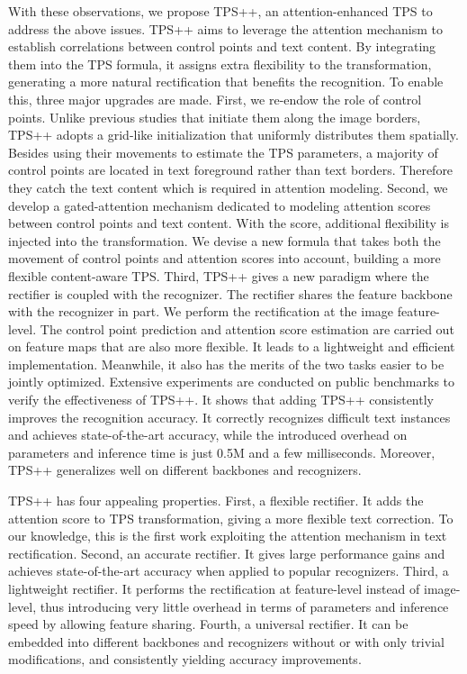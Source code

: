 \documentclass{article}
\begin{document}
With these observations, we propose TPS++, an attention-enhanced TPS to address the above issues. TPS++ aims to leverage the attention mechanism to establish correlations between control points and text content. By integrating them into the TPS formula, it assigns extra flexibility to the transformation, generating a more natural rectification that benefits the recognition. To enable this, three major upgrades are made. First, we re-endow the role of control points. Unlike previous studies that initiate them along the image borders, TPS++ adopts a grid-like initialization that uniformly distributes them spatially. Besides using their movements to estimate the TPS parameters, a majority of control points are located in text foreground rather than text borders. Therefore they catch the text content which is required in attention modeling. Second, we develop a gated-attention mechanism dedicated to modeling attention scores between control points and text content. With the score, additional flexibility is injected into the transformation. We devise a new formula that takes both the movement of control points and attention scores into account, building a more flexible content-aware TPS. Third, TPS++ gives a new paradigm where the rectifier is coupled with the recognizer. The rectifier shares the feature backbone with the recognizer in part. We perform the rectification at the image feature-level. The control point prediction and attention score estimation are carried out on feature maps that are also more flexible. It leads to a lightweight and efficient implementation. Meanwhile, it also has the merits of the two tasks easier to be jointly optimized. Extensive experiments are conducted on public benchmarks to verify the effectiveness of TPS++. It shows that adding TPS++ consistently improves the recognition accuracy. It correctly recognizes difficult text instances and achieves state-of-the-art accuracy, while the introduced overhead on parameters and inference time is just 0.5M and a few milliseconds. Moreover, TPS++ generalizes well on different backbones and recognizers.

TPS++ has four appealing properties. First, a flexible rectifier. It adds the attention score to TPS transformation, giving a more flexible text correction. To our knowledge, this is the first work exploiting the attention mechanism in text rectification. Second, an accurate rectifier. It gives large performance gains and achieves state-of-the-art accuracy when applied to popular recognizers. Third, a lightweight rectifier. It performs the rectification at feature-level instead of image-level, thus introducing very little overhead in terms of parameters and inference speed by allowing feature sharing. Fourth, a universal rectifier. It can be embedded into different backbones and recognizers without or with only trivial modifications, and consistently yielding accuracy improvements.
\end{document}
